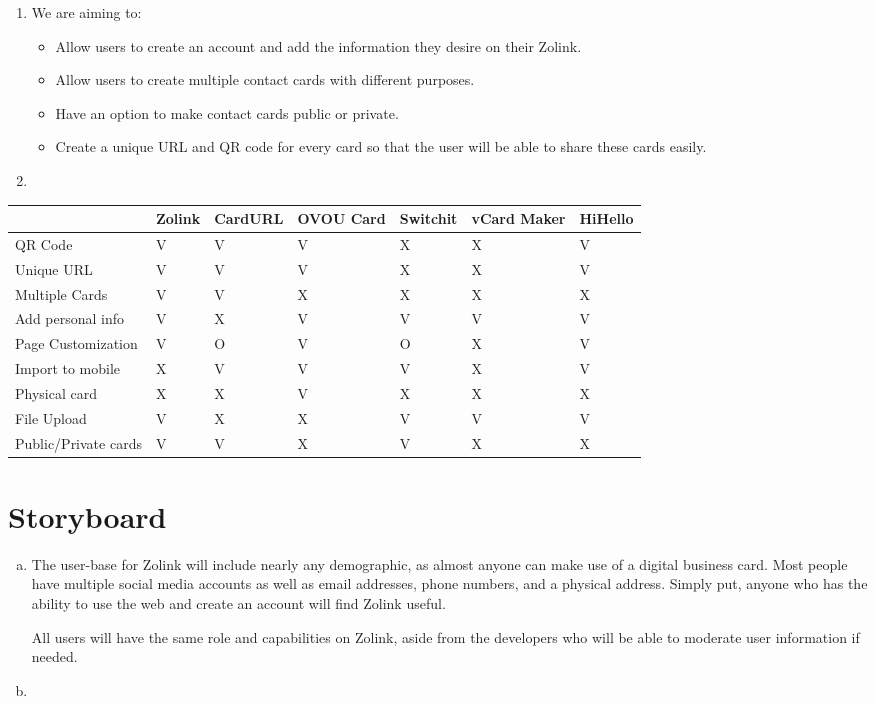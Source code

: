 \documentclass[12pt]{article}%
\begin{document}
\begin{enumerate}[2.a.]
        \item We are aiming to:
        \begin{itemize}
            \item Allow users to create an account and add the information they desire on their Zolink.
            \item Allow users to create multiple contact cards with different purposes.
            \item Have an option to make contact cards public or private.
            \item Create a unique URL and QR code for every card so that the user will be able to share these cards easily.
        \end{itemize}
        \item
    \end{enumerate}

\begin{center}
    \begin{tabular}{|l|l|l|l|l|l|l|}
        \hline
         & Zolink & CardURL & OVOU Card & Switchit & vCard Maker & HiHello \\
         \hline
        QR Code & V & V & V & X & X & V \\
        \hline
        Unique URL & V & V & V & X & X & V \\
        \hline
        Multiple Cards & V & V & X & X & X & X \\
        \hline
        Add personal info & V & X & V & V & V & V \\
        \hline
        Page Customization & V & O & V & O & X & V \\
        \hline
        Import to mobile & X & V & V & V & X & V \\
        \hline
        Physical card & X & X & V & X & X & X \\
        \hline
        File Upload & V & X & X & V & V & V \\
        \hline
        Public/Private cards & V & V & X & V & X & X \\
        \hline
    \end{tabular}
\end{center}

\clearpage
\section{Storyboard}

\begin{enumerate}[a.]
    \item The user-base for Zolink will include nearly any demographic, as almost anyone can make use of a digital business card. Most people have multiple social media accounts as well as email addresses, phone numbers, and a physical address. Simply put, anyone who has the ability to use the web and create an account will find Zolink useful.

    All users will have the same role and capabilities on Zolink, aside from the developers who will be able to moderate user information if needed.

    \item
\end{enumerate}
\end{document}
